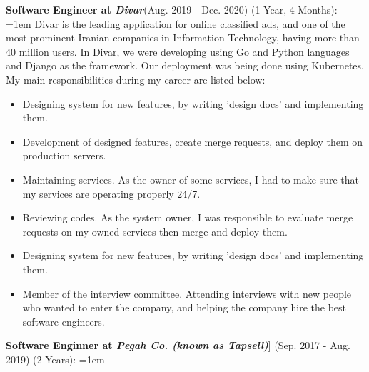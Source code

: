 \documentclass[line, mm]{sampleCV}
\begin{document}
\begin{resume}
\begin{list2}
\item \textbf{Software Engineer at \textit{Divar}}(Aug. 2019 - Dec. 2020) (1 Year, 4 Months): \\
\hangindent=1em
Divar is the leading application for online classified ads, and one of the most prominent Iranian companies in Information Technology, having more than 40 million users. In Divar, we were developing using Go and Python languages and Django as the framework. Our deployment was being done using Kubernetes. \\ My main responsibilities during my career are listed below:
\begin{itemize}
	\item Designing system for new features, by writing 'design docs' and implementing them.
	\item Development of designed features, create merge requests, and deploy them on production servers.
	\item Maintaining services. As the owner of some services, I had to make sure that my services are operating properly 24/7. 
	\item Reviewing codes. As the system owner, I was responsible to evaluate merge requests on my owned services then merge and deploy them.
	\item Designing system for new features, by writing 'design docs' and implementing them.
	\item Member of the interview committee. Attending interviews with new people who wanted to enter the company, and helping the company hire the best software engineers.
\end{itemize}



\item \textbf{Software Enginner at \textit{Pegah Co. (known as Tapsell)}}] (Sep. 2017 - Aug. 2019) (2 Years):
\hangindent=1em


\end{list2}
\end{resume}
\end{document}
